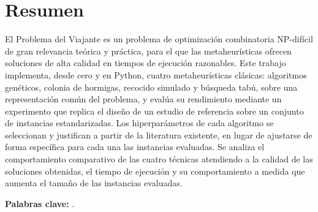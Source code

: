 %
%
%
% 
%
%
%
%

\chapter*{Resumen}
\label{cha:resumen}


El Problema del Viajante es un problema de optimización combinatoria NP-difícil de gran relevancia teórica y
práctica, para el que las metaheurísticas ofrecen soluciones de alta calidad en tiempos de ejecución razonables. Este
trabajo implementa, desde cero y en Python, cuatro metaheurísticas clásicas: algoritmos genéticos, colonia de hormigas,
recocido simulado y búsqueda tabú, sobre una representación común del problema, y evalúa su rendimiento mediante un 
experimento que replica el diseño de un estudio de referencia sobre un conjunto de instancias estandarizadas. Los 
hiperparámetros de cada algoritmo se seleccionan y justifican a partir de la literatura existente, en lugar de ajustarse de
forma específica para cada una las instancias evaluadas. Se analiza el comportamiento comparativo de las cuatro técnicas
atendiendo a la calidad de las soluciones obtenidas, el tiempo de ejecución y su comportamiento a medida que aumenta el
tamaño de las instancias evaluadas.

\textbf{Palabras clave:} \myThesisKeywords.



